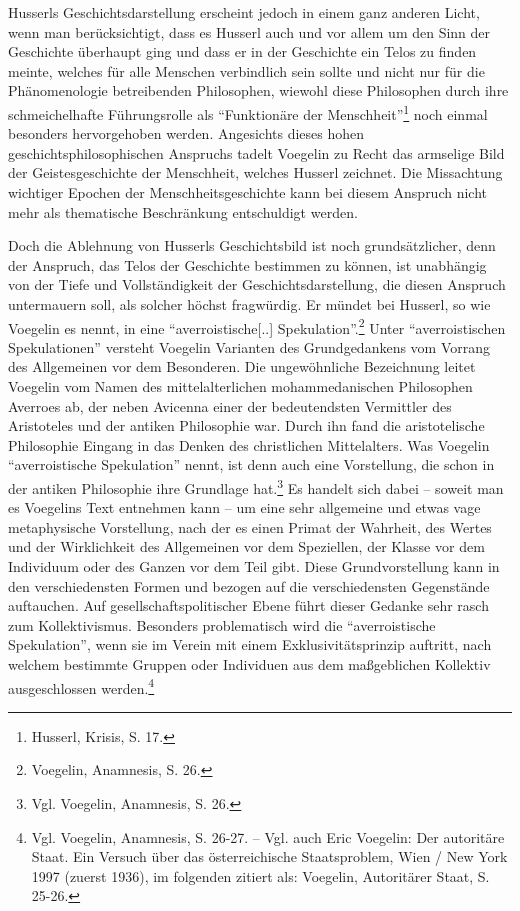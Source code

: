 Husserls Geschichtsdarstellung erscheint jedoch in einem ganz anderen Licht,
wenn man berücksichtigt, dass es Husserl auch und vor allem um den Sinn der
Geschichte überhaupt ging und dass er in der Geschichte ein Telos zu finden
meinte, welches für alle Menschen verbindlich sein sollte und nicht nur für
die Phänomenologie betreibenden Philosophen, wiewohl diese Philosophen durch
ihre schmeichelhafte Führungsrolle als "`Funktionäre der
Menschheit"'\footnote{Husserl, Krisis, S. 17.} noch einmal besonders
hervorgehoben werden. Angesichts dieses hohen geschichtsphilosophischen
Anspruchs tadelt Voegelin zu Recht das armselige Bild der Geistesgeschichte
der Menschheit, welches Husserl zeichnet. Die Missachtung wichtiger Epochen der
Menschheitsgeschichte kann bei diesem Anspruch nicht mehr als thematische
Beschränkung entschuldigt werden.

Doch die Ablehnung von Husserls Geschichtsbild ist noch grundsätzlicher, denn
der Anspruch, das Telos der Geschichte bestimmen zu können, ist unabhängig von
der Tiefe und Vollständigkeit der Geschichtsdarstellung, die diesen Anspruch
untermauern soll, als solcher höchst fragwürdig. Er mündet bei Husserl, so wie
Voegelin es nennt, in eine "`averroistische[..]
Spekulation"'.\footnote{Voegelin, Anamnesis, S. 26.} Unter "`averroistischen
Spekulationen"' versteht Voegelin Varianten des Grundgedankens vom Vorrang des
Allgemeinen vor dem Besonderen. Die ungewöhnliche Bezeichnung leitet Voegelin
vom Namen des mittelalterlichen mohammedanischen Philosophen Averroes ab, der
neben Avicenna einer der bedeutendsten Vermittler des Aristoteles und der
antiken Philosophie war. Durch ihn fand die aristotelische Philosophie Eingang
in das Denken des christlichen Mittelalters. Was Voegelin "`averroistische
Spekulation"' nennt, ist denn auch eine Vorstellung, die schon in der antiken
Philosophie ihre Grundlage hat.\footnote{Vgl. Voegelin, Anamnesis, S. 26.} Es
handelt sich dabei -- soweit man es Voegelins Text entnehmen kann -- um eine
sehr allgemeine und etwas vage metaphysische Vorstellung, nach der es einen
Primat der Wahrheit, des Wertes und der Wirklichkeit des Allgemeinen vor dem
Speziellen, der Klasse vor dem Individuum oder des Ganzen vor dem Teil gibt.
Diese Grundvorstellung kann in den verschiedensten Formen und bezogen auf die
verschiedensten Gegenstände auftauchen. Auf gesellschaftspolitischer Ebene
führt dieser Gedanke sehr rasch zum Kollektivismus. Besonders problematisch
wird die "`averroistische Spekulation"', wenn sie im Verein mit einem
Exklusivitätsprinzip auftritt, nach welchem bestimmte Gruppen oder Individuen
aus dem maßgeblichen Kollektiv ausgeschlossen werden.\footnote{Vgl. Voegelin,
  Anamnesis, S. 26-27. -- Vgl. auch Eric Voegelin: Der autoritäre Staat. Ein
  Versuch über das österreichische Staatsproblem, Wien / New York 1997 (zuerst
  1936), im folgenden zitiert als: Voegelin, Autoritärer Staat, S. 25-26.}

